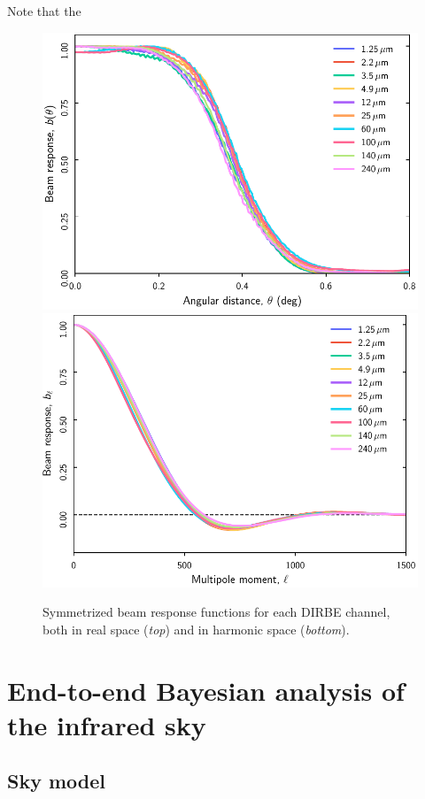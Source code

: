 \documentclass{aa}
\begin{document}
Note that the \begin{figure}
  \centering
  \includegraphics[width=\linewidth]{figs/DIRBE_beam_theta.pdf}\\
  \includegraphics[width=\linewidth]{figs/DIRBE_beam_ell.pdf}
  \caption{Symmetrized beam response functions for each DIRBE channel, both in real space (\emph{top}) and in harmonic space (\emph{bottom}).}
  \label{fig:beams}
\end{figure}

\section{End-to-end Bayesian analysis of the infrared sky}
\subsection{Sky model}
\end{document}

